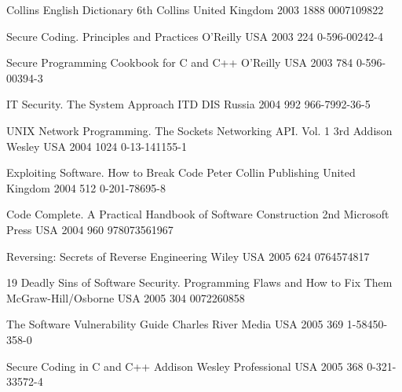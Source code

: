\begin{thebibliography}{9}
		{}
		{Collins {E}nglish {D}ictionary}
		{6th}
		{Collins}
		{United Kingdom}
		{2003}
		{1888}
		{0007109822}
	
		{
			\biband
			}
		{Secure Coding. Principles and Practices}
		{}
		{O'Reilly}
		{USA}
		{2003}
		{224}
		{0-596-00242-4}
	
		{
			\biband
			}
		{Secure Programming Cookbook for {C} and {C++}}
		{}
		{O'Reilly}
		{USA}
		{2003}
		{784}
		{0-596-00394-3}
	
		{}
		{{IT} Security. The System Approach}
		{}
		{ITD DIS}
		{Russia}
		{2004}
		{992}
		{966-7992-36-5}
	
		{
			\biband
			\biband
			}
		{{UNIX} Network Programming. The Sockets Networking {API}. Vol. 1}
		{3rd}
		{Addison Wesley}
		{USA}
		{2004}
		{1024}
		{0-13-141155-1}
	
		{
			\biband
			}
		{Exploiting Software. How to Break Code}
		{}
		{Peter Collin Publishing}
		{United Kingdom}
		{2004}
		{512}
		{0-201-78695-8}
	
		{}
		{Code Complete. A Practical Handbook of Software Construction}
		{2nd}
		{Microsoft Press}
		{USA}
		{2004}
		{960}
		{978073561967}
	
		{}
		{Reversing: Secrets of Reverse Engineering}
		{}
		{Wiley}
		{USA}
		{2005}
		{624}
		{0764574817}
	
		{
			\biband
			\biband
			}
		{19 Deadly Sins of Software Security. Programming Flaws and How to Fix Them}
		{}
		{McGraw-Hill/Osborne}
		{USA}
		{2005}
		{304}
		{0072260858}
	
		{
			\biband
			}
		{The Software Vulnerability Guide}
		{}
		{Charles River Media}
		{USA}
		{2005}
		{369}
		{1-58450-358-0}
	
		{}
		{Secure Coding in {C} and {C++}}
		{}
		{Addison Wesley Professional}
		{USA}
		{2005}
		{368}
		{0-321-33572-4}
	

\end{thebibliography}
